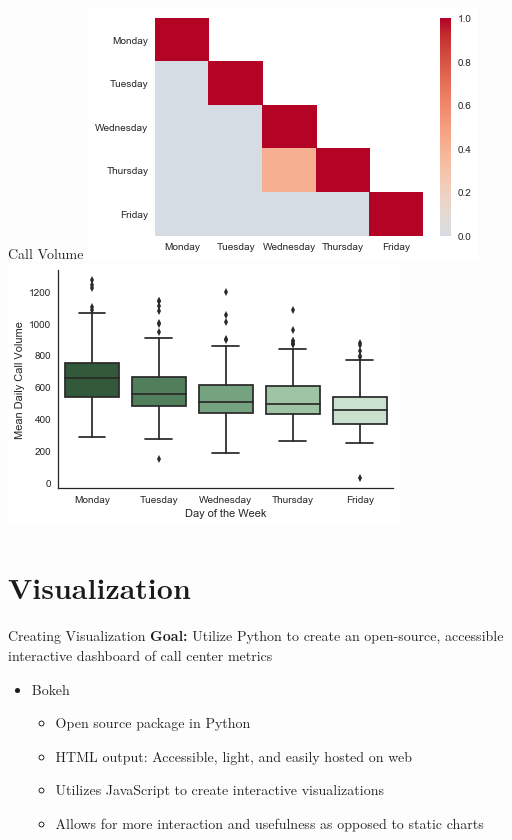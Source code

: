 \documentclass{beamer}
\begin{document}
\begin{frame}{Call Volume}
    \includegraphics[scale=0.3]{daily_heatmap}
    \includegraphics[scale=0.3]{daily_call_boxplot}
\end{frame}
 





    
\section{Visualization}


\begin{frame}{Creating Visualization}
   \textbf{Goal: }Utilize Python to create an open-source, accessible interactive dashboard of call center metrics
\begin{itemize}
	\item Bokeh
	\begin{itemize}
		\item Open source package in Python
		\item HTML output:  Accessible, light, and easily hosted on web
	\item Utilizes JavaScript to create interactive visualizations
		\item Allows for more interaction and usefulness as opposed to static charts
		\end{itemize}
\end{itemize}
    
    
    
\end{frame}
\end{document}
